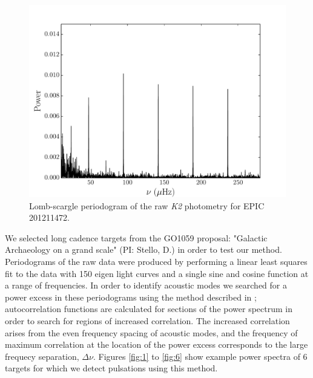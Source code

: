 \documentclass[useAMS, usenatbib]{aastex}
\begin{document}
\begin{figure}
\begin{center}
\includegraphics[width=6in, clip=true]{raw_201211472.pdf}
\caption{Lomb-scargle periodogram of the raw {\it K2} photometry for
	EPIC 201211472.}
\label{fig:raw}
\end{center}
\end{figure}

We selected long cadence targets from the GO1059 proposal: "Galactic
Archaeology on a grand scale" (PI: Stello, D.) in order to test our method.
Periodograms of the raw data were produced by performing a linear least
squares fit to the data with 150 eigen light curves and a single sine and
cosine function at a range of frequencies.
In order to identify acoustic modes we searched for a power excess in these
periodograms using the method described in \citet{Huber2009}; autocorrelation
functions are calculated for sections of the power spectrum in order to search
for regions of increased correlation.
The increased correlation arises from the even frequency spacing of acoustic
modes, and the frequency of maximum correlation at the location of the power
excess corresponds to the large frequecy separation, $\Delta\nu$.
Figures \ref{fig:1} to \ref{fig:6} show example power spectra of 6 targets for
which we detect pulsations using this method.
\end{document}
